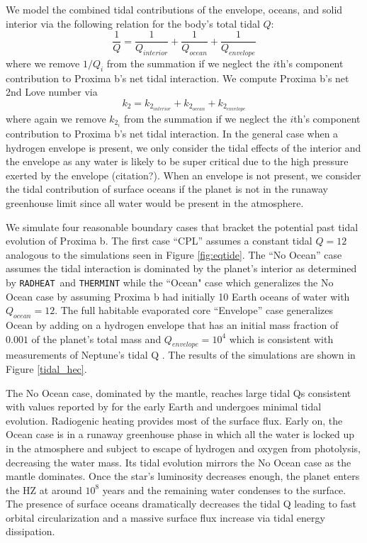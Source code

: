 \documentclass[preprint,12pt]{aastex}
\newcommand{\xxx}[1]{{\color{red} #1}} %
\def\radheat{\texttt{\footnotesize{RADHEAT}}\xspace}
\def\thermint{\texttt{\footnotesize{THERMINT}}\xspace}
\begin{document}
We model the combined tidal contributions of the envelope, oceans, and solid interior via the following relation for the body's total tidal $Q$:
\begin{equation}
\label{eqn:Q_hec}
\frac{1}{Q} = \frac{1}{Q_{interior}} + \frac{1}{Q_{ocean}} + \frac{1}{Q_{envelope}}
\end{equation}
where we remove $1/Q_i$ from the summation if we neglect the $i$th's component contribution to Proxima b's net tidal interaction.  We compute Proxima b's 
net 2nd Love number via
\begin{equation}
\label{eqn:k2_hec}
k_2 = k_{2_{interior}} + k_{2_{ocean}}+ k_{2_{envelope}}
\end{equation}
where again we remove $k_{2_{i}}$ from the summation if we neglect the $i$th's component contribution to Proxima b's net tidal interaction.  In the general 
case when a hydrogen envelope is present, we only consider the tidal effects of the interior and the envelope as any water is likely to be super critical due to 
the high pressure exerted by the envelope \xxx{(citation?)}.  When an envelope is not present, we consider the tidal contribution of surface oceans if the planet 
is not in the runaway greenhouse limit since all water would be present in the atmosphere.

We simulate four reasonable boundary cases that bracket the potential past tidal evolution of Proxima b.  The first case ``CPL'' assumes a constant tidal 
$Q = 12$ analogous to the simulations seen in Figure \ref{fig:eqtide}.  The ``No Ocean'' case assumes the tidal
interaction is dominated by the planet's interior as determined by \radheat \ and \thermint while the ``Ocean" case  which generalizes the No Ocean case by 
assuming Proxima b had initially 10 Earth oceans of water with $Q_{ocean} = 12$.  The full habitable evaporated core ``Envelope'' case generalizes
Ocean by adding on a hydrogen envelope that has an initial mass fraction of $0.001$ of the planet's total mass and $Q_{envelope} = 10^4$ which is 
consistent with measurements of Neptune's tidal Q \citep{ZhangHamilton08}.  The results of the simulations are shown in Figure \ref{tidal_hec}.

The No Ocean case, dominated by the mantle, reaches large tidal Qs consistent with values reported by \cite{Zahnle15} for the early Earth and undergoes 
minimal tidal evolution.  Radiogenic heating provides most of the surface flux.  Early on, the Ocean case is in a runaway greenhouse phase in which all the water 
is locked up in the atmosphere and subject to escape of hydrogen and oxygen from photolysis, decreasing the water mass.  Its tidal evolution mirrors the No 
Ocean case as the mantle dominates.  Once the star's luminosity decreases enough, the planet enters the HZ at around $10^8$ years and the remaining water 
condenses to the surface. The presence of surface oceans dramatically decreases the tidal Q leading to fast orbital circularization and a massive surface flux 
increase via tidal energy dissipation.
\end{document}
